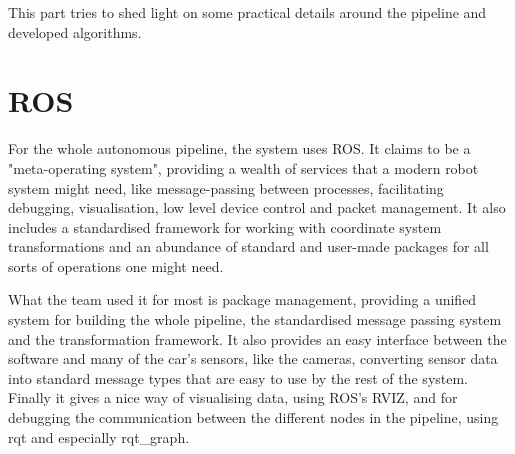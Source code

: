 This part tries to shed light on some practical details around the pipeline and developed algorithms. 

\section{ROS}

For the whole autonomous pipeline, the system uses \gls{ROS}\cite{ROS}. It claims to be a "meta-operating system", providing a wealth of services that a modern robot system might need, like message-passing between processes, facilitating debugging, visualisation, low level device control and packet management. It also includes a standardised framework for working with coordinate system transformations and an abundance of standard and user-made packages for all sorts of operations one might need. 

What the team used it for most is package management, providing a unified system for building the whole pipeline, the standardised message passing system and the transformation framework. It also provides an easy interface between the software and many of the car's sensors, like the cameras, converting sensor data into standard message types that are easy to use by the rest of the system. Finally it gives a nice way of visualising data, using \gls{ROS}'s RVIZ, and for debugging the communication between the different nodes in the pipeline, using rqt and especially rqt\_graph.